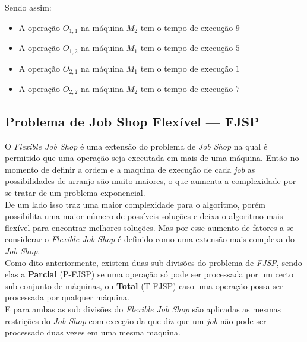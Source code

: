             \noindent Sendo assim:\hfill
            \begin{itemize}
                \item A operação $O_{1,1}$ na máquina $M_2$ tem o tempo de execução $9$
                \item A operação $O_{1,2}$ na máquina $M_1$ tem o tempo de execução $5$
                \item A operação $O_{2,1}$ na máquina $M_1$ tem o tempo de execução $1$
                \item A operação $O_{2,2}$ na máquina $M_2$ tem o tempo de execução $7$
            \end{itemize}
            



    \subsection{Problema de Job Shop Flexível — FJSP}
            O \textit{Flexible Job Shop} é uma extensão do problema de \textit{Job Shop} na qual é permitido que uma operação seja executada em mais de uma máquina. Então no momento de definir a ordem e a maquina de execução de cada \textit{job} as possibilidades de arranjo são muito maiores, o que aumenta a complexidade por se tratar de um problema exponencial.\\
            \indent De um lado isso traz uma maior complexidade para o algoritmo, porém possibilita uma maior número de possíveis soluções e deixa o algoritmo mais flexível para encontrar melhores soluções. Mas por esse aumento de fatores a se considerar o \textit{Flexible Job Shop} é definido como uma extensão mais complexa do \textit{Job Shop}.\\
            \indent Como dito anteriormente, existem duas sub divisões do problema de \textit{FJSP}, sendo elas a \textbf{Parcial} (P-FJSP) se uma operação só pode ser processada por um certo sub conjunto de máquinas, ou \textbf{Total} (T-FJSP) caso uma operação possa ser processada por qualquer máquina.\\
            \indent E para ambas as sub divisões do \textit{Flexible Job Shop} são aplicadas as mesmas restrições do \textit{Job Shop} com exceção da que diz que um \textit{job} não pode ser processado duas vezes em uma mesma maquina.\hfill

